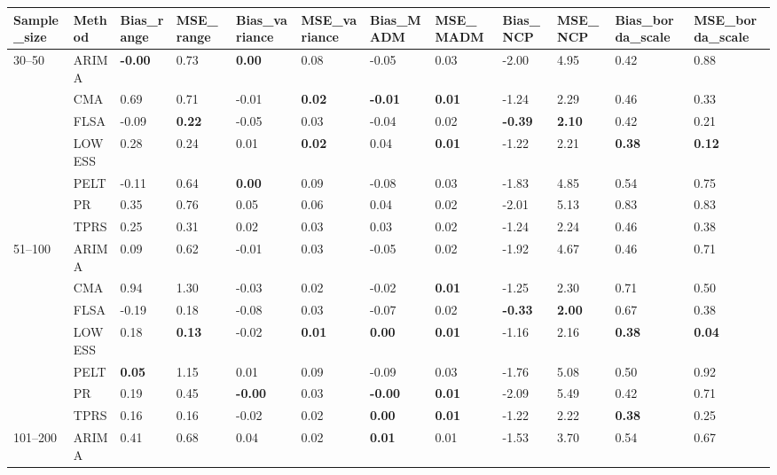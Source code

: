 \begin{table}[ht]
\centering
\begin{tabular}{llllllllllll}
  \toprule
Sample_size & Method & Bias_range & MSE_range & Bias_variance & MSE_variance & Bias_MADM & MSE_MADM & Bias_NCP & MSE_NCP & Bias_borda_scale & MSE_borda_scale \\ 
  \midrule
30–50 & ARIMA & \textbf{-0.00} & 0.73 & \textbf{0.00} & 0.08 & -0.05 & 0.03 & -2.00 & 4.95 & 0.42 & 0.88 \\ 
   & CMA & 0.69 & 0.71 & -0.01 & \textbf{0.02} & \textbf{-0.01} & \textbf{0.01} & -1.24 & 2.29 & 0.46 & 0.33 \\ 
   & FLSA & -0.09 & \textbf{0.22} & -0.05 & 0.03 & -0.04 & 0.02 & \textbf{-0.39} & \textbf{2.10} & 0.42 & 0.21 \\ 
   & LOWESS & 0.28 & 0.24 & 0.01 & \textbf{0.02} & 0.04 & \textbf{0.01} & -1.22 & 2.21 & \textbf{0.38} & \textbf{0.12} \\ 
   & PELT & -0.11 & 0.64 & \textbf{0.00} & 0.09 & -0.08 & 0.03 & -1.83 & 4.85 & 0.54 & 0.75 \\ 
   & PR & 0.35 & 0.76 & 0.05 & 0.06 & 0.04 & 0.02 & -2.01 & 5.13 & 0.83 & 0.83 \\ 
   & TPRS & 0.25 & 0.31 & 0.02 & 0.03 & 0.03 & 0.02 & -1.24 & 2.24 & 0.46 & 0.38 \\ 
  51–100 & ARIMA & 0.09 & 0.62 & -0.01 & 0.03 & -0.05 & 0.02 & -1.92 & 4.67 & 0.46 & 0.71 \\ 
   & CMA & 0.94 & 1.30 & -0.03 & 0.02 & -0.02 & \textbf{0.01} & -1.25 & 2.30 & 0.71 & 0.50 \\ 
   & FLSA & -0.19 & 0.18 & -0.08 & 0.03 & -0.07 & 0.02 & \textbf{-0.33} & \textbf{2.00} & 0.67 & 0.38 \\ 
   & LOWESS & 0.18 & \textbf{0.13} & -0.02 & \textbf{0.01} & \textbf{0.00} & \textbf{0.01} & -1.16 & 2.16 & \textbf{0.38} & \textbf{0.04} \\ 
   & PELT & \textbf{0.05} & 1.15 & 0.01 & 0.09 & -0.09 & 0.03 & -1.76 & 5.08 & 0.50 & 0.92 \\ 
   & PR & 0.19 & 0.45 & \textbf{-0.00} & 0.03 & \textbf{-0.00} & \textbf{0.01} & -2.09 & 5.49 & 0.42 & 0.71 \\ 
   & TPRS & 0.16 & 0.16 & -0.02 & 0.02 & \textbf{0.00} & \textbf{0.01} & -1.22 & 2.22 & \textbf{0.38} & 0.25 \\ 
  101–200 & ARIMA & 0.41 & 0.68 & 0.04 & 0.02 & \textbf{0.01} & 0.01 & -1.53 & 3.70 & 0.54 & 0.67 \\ 

\end{tabular}
\end{table}
